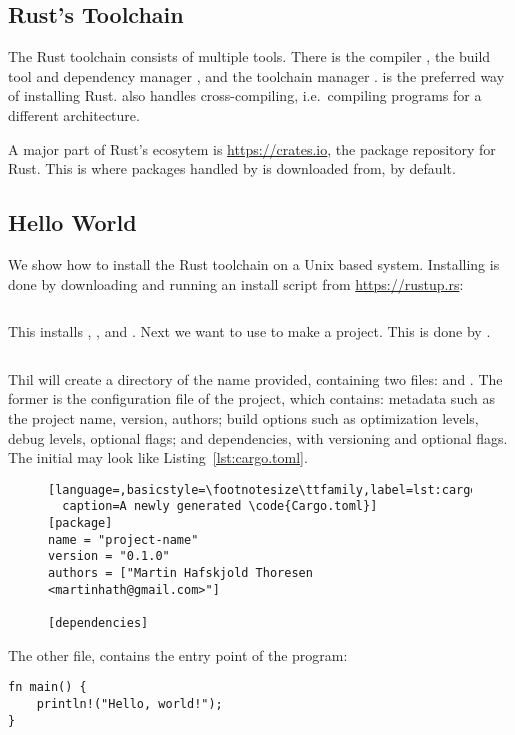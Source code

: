 \documentclass[a4paper,twoside]{report}
\begin{document}
\begin{appendices}
  \chapter{Rust's Toolchain}
  The Rust toolchain consists of multiple tools.
  There is the compiler \rustc{}, the build tool and dependency manager \cargo{},
  and the toolchain manager \rustup.
  \rustup{} is the preferred way of installing Rust.
  \rustup{} also handles cross-compiling, i.e.\ compiling programs for a different
  architecture.

  A major part of Rust's ecosytem is \url{https://crates.io}, the package repository
  for Rust. This is where packages handled by \cargo{} is downloaded from, by default.

  \section*{Hello World}
  We show how to install the Rust toolchain on a Unix based system.
  Installing \rustup{} is done by downloading and running an install script from
  \url{https://rustup.rs}:
  \begin{lstlisting}[language=Bash,numbers=none]
% curl https://sh.rustup.rs -sSf | sh
  \end{lstlisting}
  This installs \rustup{}, \cargo{}, and \rustc{}.
  Next we want to use \cargo{} to make a project. This is done by .
  \begin{lstlisting}[language=Bash,numbers=none]
% cargo init --bin <name-of-project>
  \end{lstlisting}
  Thil will create a directory of the name provided, containing two files:
   and .
  The former is the configuration file of the project, which contains:
  metadata such as the project name, version, authors;
  build options such as optimization levels, debug levels, optional flags;
  and dependencies, with versioning and optional flags.
  The initial  may look like Listing~\ref{lst:cargo.toml}.
  \begin{figure}[ht]
  \begin{lstlisting}[language=,basicstyle=\footnotesize\ttfamily,label=lst:cargo.toml,
  caption=A newly generated \code{Cargo.toml}]
[package]
name = "project-name"
version = "0.1.0"
authors = ["Martin Hafskjold Thoresen <martinhath@gmail.com>"]

[dependencies]
  \end{lstlisting}
\end{figure}
  The other file,  contains the entry point of the program:
  \begin{lstlisting}
fn main() {
    println!("Hello, world!");
}
  \end{lstlisting}


\end{appendices}
\end{document}
